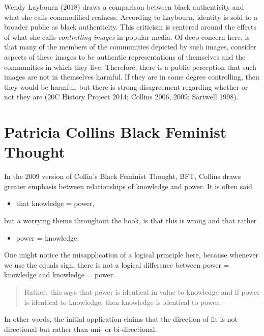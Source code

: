 \documentclass[
  letterpaper,
  DIV=11,
  numbers=noendperiod]{scrreprt}
\providecommand{\tightlist}{%
  \setlength{\itemsep}{0pt}\setlength{\parskip}{0pt}}\usepackage{longtable,booktabs,array}
\begin{document}
\begin{tcolorbox}[enhanced jigsaw, arc=.35mm, breakable, rightrule=.15mm, colback=white, colframe=quarto-callout-important-color-frame, bottomrule=.15mm, leftrule=.75mm, opacityback=0, toprule=.15mm, left=2mm]
\begin{tcolorbox}[enhanced jigsaw, arc=.35mm, breakable, rightrule=.15mm, colback=white, colframe=quarto-callout-tip-color-frame, bottomrule=.15mm, leftrule=.75mm, opacityback=0, toprule=.15mm, left=2mm]
Wendy Laybourn (2018) draws a comparison between black authenticity and
what she calls commodified realness. According to Laybourn, identity is
sold to a broader public as black authenticity. This criticism is
centered around the effects of what she calls \emph{controlling images}
in popular media. Of deep concern here, is that many of the members of
the communities depicted by such images, consider aspects of these
images to be authentic representations of themselves and the communities
in which they live. Therefore, there is a public perception that such
images are not in themselves harmful. If they are in some degree
controlling, then they would be harmful, but there is strong
disagreement regarding whether or not they are (20C History Project
2014; Collins 2006, 2009; Sartwell 1998).

\chapter{Patricia Collins Black Feminist
Thought}\label{patricia-collins-black-feminist-thought}

In the 2009 version of Collin's Black Feminist Thought, BFT, Collins
draws greater emphasis between relationships of knowledge and power. It
is often said

\begin{itemize}
\tightlist
\item
  that knowledge = power,
\end{itemize}

but a worrying theme throughout the book, is that this is wrong and that
rather

\begin{itemize}
\tightlist
\item
  power = knowledge.
\end{itemize}

One might notice the misapplication of a logical principle here, because
whenever we use the equals sign, there is not a logical difference
between power = knowledge and knowledge = power.

\begin{quote}
Rather, this says that power is identical in value to knowledge and if
power is identical to knowledge, then knowledge is identical to power.
\end{quote}

In other words, the initial application claims that the direction of fit
is not directional but rather than uni- or bi-directional.


\end{tcolorbox}
\end{tcolorbox}
\end{document}
